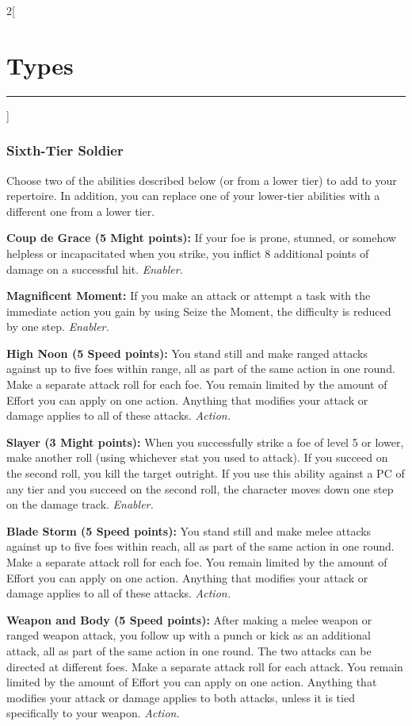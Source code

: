 \documentclass[a4paper,10pt,final]{book}
\newcommand{\HRule}{\rule{\linewidth}{0.5mm}} %
\newcommand{\newSection}[1]{\section*{#1} \addcontentsline{toc}{section}{#1} \label{sec:#1} \HRule}
\newcommand{\itemAbility}[2]{\textcolor{25gray}{\textbullet\textbf{ #1:}} {#2}\par}
\newcommand{\enabler}{\textit{ Enabler.}}
\newcommand{\action}{\textit{ Action.}}
\newenvironment{docsection}[1]
{
  \begin{multicols*}{2}[\newSection{#1}]
}
{
  \end{multicols*}
  \newpage
}
\begin{document}
\begin{docsection}{Types}
\subsubsection*{Sixth-Tier Soldier}
\label{subsub:soldierSixthTier}
Choose two of the abilities described below (or from a lower tier) to add to your repertoire. In addition, you can replace one of your lower-tier abilities with a different one from a lower tier.\par
\itemAbility{Coup de Grace (5 Might points)}{If your
foe is prone, stunned, or somehow helpless
or incapacitated when you strike, you
inflict 8 additional points of damage on a
successful hit.\enabler}
\itemAbility{Magnificent Moment}{If you make an
attack or attempt a task with the immediate
action you gain by using Seize the Moment,
the difficulty is reduced by one step.\enabler}
\itemAbility{High Noon (5 Speed points)}{You
stand still and make ranged attacks against
up to five foes within range, all as part
of the same action in one round. Make a
separate attack roll for each foe. You remain
limited by the amount of Effort you can
apply on one action. Anything that modifies
your attack or damage applies to all of these
attacks.\action}
\itemAbility{Slayer (3 Might points)}{When you
successfully strike a foe of level 5 or lower,
make another roll (using whichever stat
you used to attack). If you succeed on the
second roll, you kill the target outright. If
you use this ability against a PC of any tier
and you succeed on the second roll, the
character moves down one step on the
damage track.\enabler}
\itemAbility{Blade Storm (5 Speed points)}{You stand
still and make melee attacks against up
to five foes within reach, all as part of the
same action in one round. Make a separate
attack roll for each foe. You remain limited
by the amount of Effort you can apply on
one action. Anything that modifies your
attack or damage applies to all of these
attacks.\action}
\itemAbility{Weapon and Body (5 Speed points)}{After making a melee weapon or ranged
weapon attack, you follow up with a punch
or kick as an additional attack, all as part
of the same action in one round. The two
attacks can be directed at different foes. Make a separate attack roll for each attack.
You remain limited by the amount of Effort
you can apply on one action. Anything that
modifies your attack or damage applies to
both attacks, unless it is tied specifically to
your weapon.\action}



\end{docsection}
\end{document}
